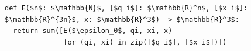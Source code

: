 \documentclass[border=10pt]{standalone}
\begin{document}
\begin{lstlisting}
def E($n$: $\mathbb{N}$, [$q_i$]: $\mathbb{R}^n$, [$x_i$]: $\mathbb{R}^{3n}$, x: $\mathbb{R}^3$) -> $\mathbb{R}^3$:
  return sum([E($\epsilon_0$, qi, xi, x) 
              for (qi, xi) in zip([$q_i$], [$x_i$])])
\end{lstlisting}
\end{document}

